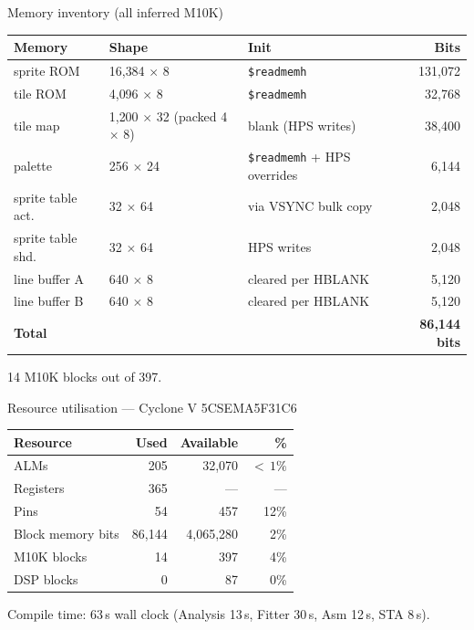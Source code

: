 \documentclass[aspectratio=169,11pt]{beamer}
\begin{document}
\begin{frame}{Memory inventory (all inferred M10K)}
\centering
\small
\renewcommand{\arraystretch}{1.18}
\begin{tabular}{lll r}
\toprule
\textbf{Memory} & \textbf{Shape} & \textbf{Init} & \textbf{Bits} \\
\midrule
sprite ROM        & 16{,}384 $\times$ 8    & \texttt{\$readmemh} & 131{,}072 \\
tile ROM          & 4{,}096 $\times$ 8     & \texttt{\$readmemh} & 32{,}768 \\
tile map          & 1{,}200 $\times$ 32 (packed 4 $\times$ 8) & blank (HPS writes) & 38{,}400 \\
palette           & 256 $\times$ 24        & \texttt{\$readmemh} + HPS overrides & 6{,}144 \\
sprite table act. & 32 $\times$ 64         & via VSYNC bulk copy & 2{,}048 \\
sprite table shd. & 32 $\times$ 64         & HPS writes          & 2{,}048 \\
line buffer A     & 640 $\times$ 8         & cleared per HBLANK  & 5{,}120 \\
line buffer B     & 640 $\times$ 8         & cleared per HBLANK  & 5{,}120 \\
\midrule
\textbf{Total} & & & \textbf{86{,}144 bits} \\
\bottomrule
\end{tabular}

\vspace{0.4cm}
\small 14 M10K blocks out of 397.
\end{frame}

\begin{frame}{Resource utilisation --- Cyclone V 5CSEMA5F31C6}
\centering
\small
\renewcommand{\arraystretch}{1.18}
\begin{tabular}{lrrr}
\toprule
\textbf{Resource} & \textbf{Used} & \textbf{Available} & \textbf{\%} \\
\midrule
ALMs              & 205    & 32{,}070    & $<\,1\%$ \\
Registers         & 365    & ---         & --- \\
Pins              & 54     & 457         & 12\% \\
Block memory bits & 86{,}144 & 4{,}065{,}280 & 2\% \\
M10K blocks       & 14     & 397         & 4\% \\
DSP blocks        & 0      & 87          & 0\% \\
\bottomrule
\end{tabular}

\vspace{0.5cm}
\small Compile time: 63\,s wall clock (Analysis 13\,s, Fitter 30\,s, Asm 12\,s, STA 8\,s).
\end{frame}
\end{document}
